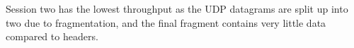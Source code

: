 Session two has the lowest throughput as the UDP datagrams are split up into two due to fragmentation, and the final fragment contains very little data compared to headers.